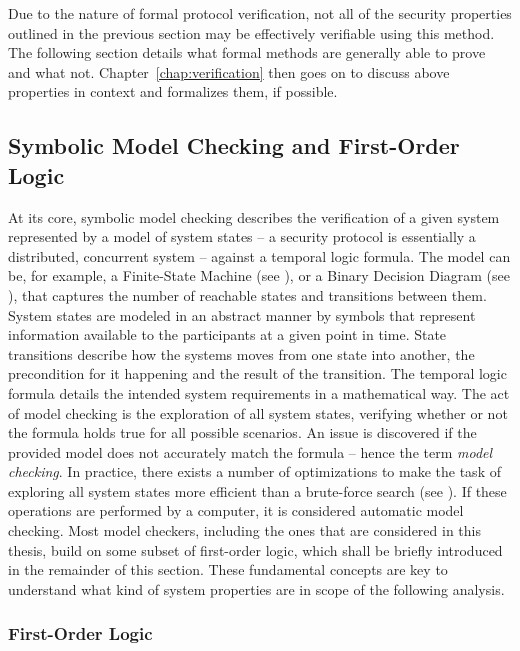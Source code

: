 Due to the nature of formal protocol verification, not all of the security properties outlined in the previous section may be effectively verifiable using this method.
The following section details what formal methods are generally able to prove and what not.
Chapter~\ref{chap:verification} then goes on to discuss above properties in context and formalizes them, if possible.

\subsection{Symbolic Model Checking and First-Order Logic}
\label{ssec:symbolic}

At its core, symbolic model checking describes the verification of a given system represented by a model of system states – a security protocol is essentially a distributed, concurrent system – against a temporal logic formula.
The model can be, for example, a Finite-State Machine (see \cite{alur1998model}), or a Binary Decision Diagram (see \cite{burch1992symbolic}), that captures the number of reachable states and transitions between them.
System states are modeled in an abstract manner by symbols that represent information available to the participants at a given point in time.
State transitions describe how the systems moves from one state into another, the precondition for it happening and the result of the transition.
The temporal logic formula details the intended system requirements in a mathematical way.
The act of model checking is the exploration of all system states, verifying whether or not the formula holds true for all possible scenarios.
An issue is discovered if the provided model does not accurately match the formula – hence the term \textit{model checking}.
In practice, there exists a number of optimizations to make the task of exploring all system states more efficient than a brute-force search (see \cite{etessami2000optimizing}).
If these operations are performed by a computer, it is considered automatic model checking.
Most model checkers, including the ones that are considered in this thesis, build on some subset of first-order logic, which shall be briefly introduced in the remainder of this section.
These fundamental concepts are key to understand what kind of system properties are in scope of the following analysis.

\subsubsection{First-Order Logic}

